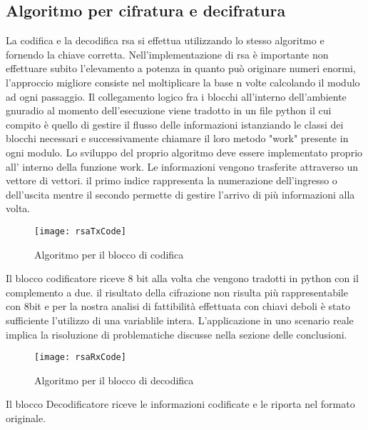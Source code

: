 \subsection{Algoritmo per cifratura e decifratura}
La codifica e la decodifica rsa si effettua utilizzando lo stesso algoritmo e fornendo la chiave corretta. Nell'implementazione di rsa è importante non effettuare subito l'elevamento a potenza in quanto può originare numeri enormi, l'approccio migliore consiste nel  moltiplicare la base n volte calcolando il modulo ad ogni passaggio.
Il collegamento logico fra i blocchi all'interno dell'ambiente gnuradio al momento dell'esecuzione viene tradotto in un file python il cui compito è quello di gestire il flusso delle informazioni istanziando le classi dei blocchi necessari e successivamente chiamare il loro metodo "work" presente in ogni modulo.
 Lo sviluppo del proprio algoritmo deve essere implementato proprio all' interno della funzione work.
 Le informazioni vengono trasferite attraverso un vettore di vettori. il primo indice rappresenta la numerazione dell'ingresso o dell'uscita mentre il secondo permette di gestire l'arrivo di più informazioni alla volta.
\begin{figure}[h]
	\centering
	\texttt{[image: rsaTxCode]}
	\caption{Algoritmo per il blocco di codifica}
\end{figure}
Il blocco codificatore riceve 8 bit alla volta che vengono tradotti in python con il complemento a due. il risultato della cifrazione non risulta più rappresentabile con 8bit e per la nostra analisi di fattibilità effettuata con chiavi deboli è stato sufficiente l'utilizzo di una variablile intera. L'applicazione in uno scenario reale implica la risoluzione di problematiche discusse nella sezione delle conclusioni.
\begin{figure}[h]
	\centering
	\texttt{[image: rsaRxCode]}
	\caption{Algoritmo per il blocco di decodifica}
\end{figure}
Il blocco Decodificatore riceve le informazioni codificate e le riporta nel formato originale.
